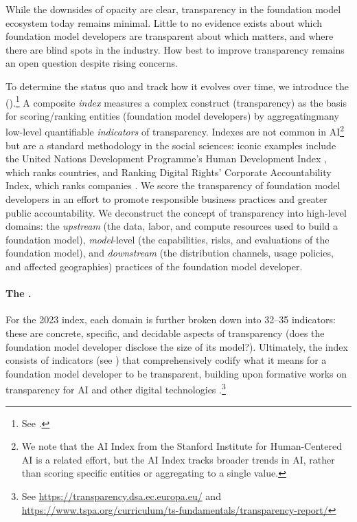 While the downsides of opacity are clear, transparency in the foundation model ecosystem today remains minimal.
Little to no evidence exists about which foundation model developers are transparent about which matters, and where there are blind spots in the industry.
How best to improve transparency remains an open question despite rising concerns.


To determine the status quo and track how it evolves over time, we introduce the \projectname (\projectabbreviation).\footnote{See \indexUrl.}
A composite \textit{index} measures a complex construct (\eg transparency) as the basis for scoring/ranking entities (\eg foundation model developers) by aggregatingmany low-level quantifiable \textit{indicators} of transparency.
Indexes are not common in AI\footnote{We note that the AI Index from the Stanford Institute for Human-Centered AI \citep{zhang2022ai, maslej2023ai} is a related effort, but the AI Index tracks broader trends in AI, rather than scoring specific entities or aggregating to a single value.} but are a standard methodology in the social sciences: iconic examples include the United Nations Development Programme's Human Development Index \citep{undp2022hdr}, which ranks countries, and Ranking Digital Rights' Corporate Accountability Index, which ranks companies \citep{rdr2020index}.
We score the transparency of foundation model developers in an effort to promote responsible business practices and greater public accountability. 
We deconstruct the concept of transparency into \numdomains high-level domains: the \textit{upstream} (\eg the data, labor, and compute resources used to build a foundation model), \textit{model}-level (\eg the capabilities, risks, and evaluations of the foundation model), and \textit{downstream} (\eg the distribution channels, usage policies, and affected geographies) practices of the foundation model developer.

\paragraph{The \projectversionedname.}
For the 2023 index, each domain is further broken down into 32--35 indicators: these are concrete, specific, and decidable aspects of transparency (\eg does the foundation model developer disclose the size of its model?). 
Ultimately, the index consists of \numindicators indicators (see ) that comprehensively codify what it means for a foundation model developer to be transparent, building upon formative works on transparency for AI and other digital technologies \citep{gebru2021datasheets, bender2018data, mitchell2018modelcards, raji2019actionable, gray2019ghost, crawford2021atlas, cdt2021, keller2022platform}.\footnote{See \url{https://transparency.dsa.ec.europa.eu/} and \url{https://www.tspa.org/curriculum/ts-fundamentals/transparency-report/}} 

